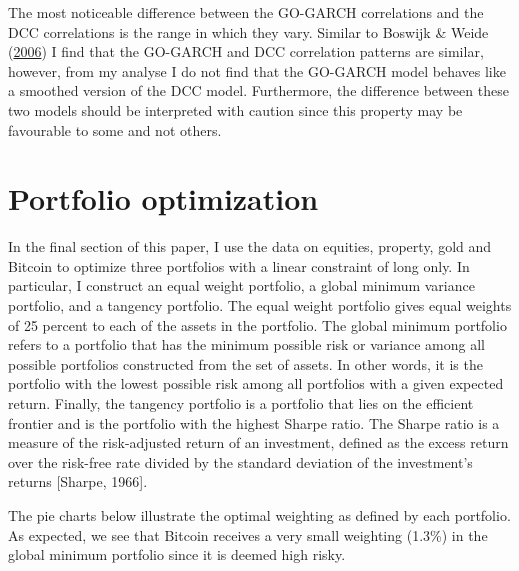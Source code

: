 \documentclass[11pt,preprint, authoryear]{elsarticle}
\numberwithin{equation}{section}
\numberwithin{figure}{section}
\numberwithin{table}{section}
\begin{document}
The most noticeable difference between the GO-GARCH correlations and the
DCC correlations is the range in which they vary. Similar to Boswijk \&
Weide (\protect\hyperlink{ref-boswijk2006wake}{2006}) I find that the
GO-GARCH and DCC correlation patterns are similar, however, from my
analyse I do not find that the GO-GARCH model behaves like a smoothed
version of the DCC model. Furthermore, the difference between these two
models should be interpreted with caution since this property may be
favourable to some and not others.

\hypertarget{portfolio-optimization}{%
\section{Portfolio optimization}\label{portfolio-optimization}}

In the final section of this paper, I use the data on equities,
property, gold and Bitcoin to optimize three portfolios with a linear
constraint of long only. In particular, I construct an equal weight
portfolio, a global minimum variance portfolio, and a tangency
portfolio. The equal weight portfolio gives equal weights of 25 percent
to each of the assets in the portfolio. The global minimum portfolio
refers to a portfolio that has the minimum possible risk or variance
among all possible portfolios constructed from the set of assets. In
other words, it is the portfolio with the lowest possible risk among all
portfolios with a given expected return. Finally, the tangency portfolio
is a portfolio that lies on the efficient frontier and is the portfolio
with the highest Sharpe ratio. The Sharpe ratio is a measure of the
risk-adjusted return of an investment, defined as the excess return over
the risk-free rate divided by the standard deviation of the investment's
returns {[}Sharpe, 1966{]}.

The pie charts below illustrate the optimal weighting as defined by each
portfolio. As expected, we see that Bitcoin receives a very small
weighting (1.3\%) in the global minimum portfolio since it is deemed
high risky.
\end{document}
